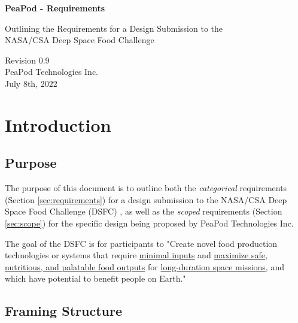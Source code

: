 \documentclass{../tex/report}
\begin{document}
\begin{titlepage}
    \begin{center}
        \vspace*{1.2cm}

        \textbf{\large{PeaPod - Requirements}}

        \vspace{0.5cm}

        Outlining the Requirements for a Design Submission to the \\NASA/CSA Deep Space Food Challenge

        \vfill
        
        \vspace{.75cm}

        Revision 0.9\\
        PeaPod Technologies Inc.\\
        July 8th, 2022

    \end{center}
\end{titlepage}

\thispagestyle{plain}

\tableofcontents
\clearpage

\section{Introduction}
\label{sec:intro}

\subsection{Purpose}
\label{sec:purpose}

The purpose of this document is to outline both the \textit{categorical} requirements (Section \ref{sec:requirements}) for a design submission to the NASA/CSA Deep Space Food Challenge (DSFC) \cite{dsfc}, as well as the \textit{scoped} requirements (Section \ref{sec:scope}) for the specific design being proposed by PeaPod Technologies Inc.

The goal of the DSFC is for participants to "Create novel food production technologies or systems that require \uline{minimal inputs} and \uline{maximize safe, nutritious, and palatable food outputs} for \uline{long-duration space missions}, and which have potential to benefit people on Earth." \cite{applicantguide}

\subsection{Framing Structure}
\label{sec:structure}
\end{document}

